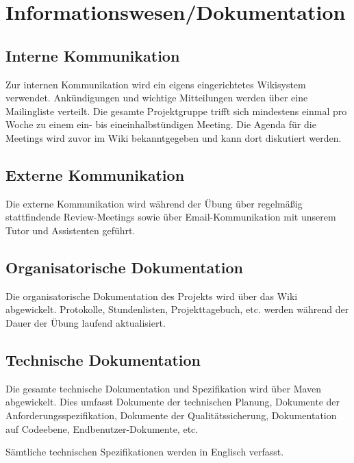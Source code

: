 

\section{Informationswesen/Dokumentation}
\subsection{Interne Kommunikation}
Zur internen Kommunikation wird ein eigens eingerichtetes Wikisystem verwendet.
Ankündigungen und wichtige Mitteilungen werden über eine Mailingliste verteilt.
Die gesamte Projektgruppe trifft sich mindestens einmal pro Woche zu einem ein- bis eineinhalbstündigen Meeting.
Die Agenda für die Meetings wird zuvor im Wiki bekanntgegeben und kann dort diskutiert werden.

\subsection{Externe Kommunikation}
Die externe Kommunikation wird während der Übung über regelmäßig stattfindende Review-Meetings sowie über Email-Kommunikation mit unserem Tutor und Assistenten geführt.

\subsection{Organisatorische Dokumentation}
Die organisatorische Dokumentation des Projekts wird über das Wiki abgewickelt.
Protokolle, Stundenlisten, Projekttagebuch, etc. werden während der Dauer der Übung laufend aktualisiert.

\subsection{Technische Dokumentation}
Die gesamte technische Dokumentation und Spezifikation wird über Maven abgewickelt.
Dies umfasst Dokumente der technischen Planung, Dokumente der Anforderungsspezifikation,
Dokumente der Qualitätssicherung, Dokumentation auf Codeebene, Endbenutzer-Dokumente, etc.

Sämtliche technischen Spezifikationen werden in Englisch verfasst.
